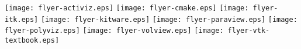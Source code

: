\newpage
\newpage
\thispagestyle{empty}
\texttt{[image: flyer-activiz.eps]}
\newpage
\thispagestyle{empty}
\texttt{[image: flyer-cmake.eps]}
\newpage
\thispagestyle{empty}
\texttt{[image: flyer-itk.eps]}
\newpage
\thispagestyle{empty}
\texttt{[image: flyer-kitware.eps]}
\newpage
\thispagestyle{empty}
\texttt{[image: flyer-paraview.eps]}
\newpage
\thispagestyle{empty}
\texttt{[image: flyer-polyviz.eps]}
\newpage
\thispagestyle{empty}
\texttt{[image: flyer-volview.eps]}
\newpage
\thispagestyle{empty}
\texttt{[image: flyer-vtk-textbook.eps]}
